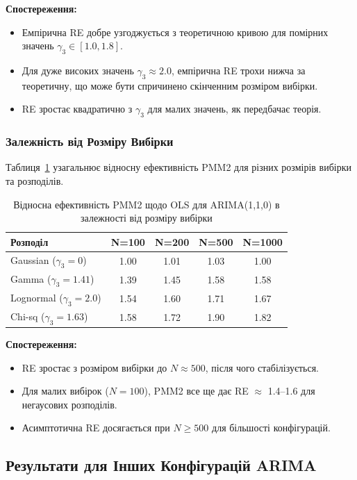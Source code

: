 \documentclass[12pt,a4paper]{article}
\begin{document}
\textbf{Спостереження:}
\begin{itemize}
    \item Емпірична RE добре узгоджується з теоретичною кривою для помірних значень $\gamma_3 \in [1.0, 1.8]$.
    \item Для дуже високих значень $\gamma_3 \approx 2.0$, емпірична RE трохи нижча за теоретичну, що може бути спричинено скінченним розміром вибірки.
    \item RE зростає квадратично з $\gamma_3$ для малих значень, як передбачає теорія.
\end{itemize}

\subsubsection{Залежність від Розміру Вибірки}

Таблиця~\ref{tab:re_vs_sample_size} узагальнює відносну ефективність PMM2 для різних розмірів вибірки та розподілів.

\begin{table}[h]
\centering
\caption{Відносна ефективність PMM2 щодо OLS для ARIMA(1,1,0) в залежності від розміру вибірки}
\label{tab:re_vs_sample_size}
\begin{tabular}{@{}lcccc@{}}
\toprule
\textbf{Розподіл} & \textbf{N=100} & \textbf{N=200} & \textbf{N=500} & \textbf{N=1000} \\
\midrule
Gaussian ($\gamma_3=0$)    & 1.00 & 1.01 & 1.03 & 1.00 \\
Gamma ($\gamma_3=1.41$)    & 1.39 & 1.45 & 1.58 & 1.58 \\
Lognormal ($\gamma_3=2.0$) & 1.54 & 1.60 & 1.71 & 1.67 \\
Chi-sq ($\gamma_3=1.63$)   & 1.58 & 1.72 & 1.90 & 1.82 \\
\bottomrule
\end{tabular}
\end{table}

\textbf{Спостереження:}
\begin{itemize}
    \item RE зростає з розміром вибірки до $N \approx 500$, після чого стабілізується.
    \item Для малих вибірок ($N = 100$), PMM2 все ще дає RE $\approx$ 1.4--1.6 для негаусових розподілів.
    \item Асимптотична RE досягається при $N \geq 500$ для більшості конфігурацій.
\end{itemize}

\subsection{Результати для Інших Конфігурацій ARIMA}
\label{subsec:other_configurations}
\end{document}
